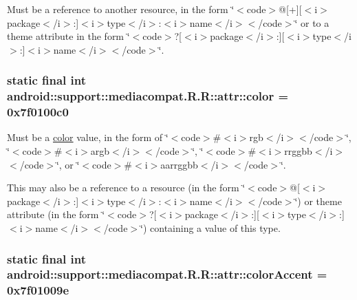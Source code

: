 Must be a reference to another resource, in the form \char`\"{}$<$code$>$@\mbox{[}+\mbox{]}\mbox{[}$<$i$>$package$<$/i$>$:\mbox{]}$<$i$>$type$<$/i$>$:$<$i$>$name$<$/i$>$$<$/code$>$\char`\"{} or to a theme attribute in the form \char`\"{}$<$code$>$?\mbox{[}$<$i$>$package$<$/i$>$:\mbox{]}\mbox{[}$<$i$>$type$<$/i$>$:\mbox{]}$<$i$>$name$<$/i$>$$<$/code$>$\char`\"{}. \hypertarget{classandroid_1_1support_1_1mediacompat_1_1_r_1_1attr_edf42dce0d16b57e1bfc7b63739b36f6}{
\subsubsection[{color}]{\setlength{\rightskip}{0pt plus 5cm}static final int android::support::mediacompat.R.R::attr::color = 0x7f0100c0}}
\label{classandroid_1_1support_1_1mediacompat_1_1_r_1_1attr_edf42dce0d16b57e1bfc7b63739b36f6}


Must be a \hyperlink{classandroid_1_1support_1_1mediacompat_1_1_r_1_1color}{color} value, in the form of \char`\"{}$<$code$>$\#$<$i$>$rgb$<$/i$>$$<$/code$>$\char`\"{}, \char`\"{}$<$code$>$\#$<$i$>$argb$<$/i$>$$<$/code$>$\char`\"{}, \char`\"{}$<$code$>$\#$<$i$>$rrggbb$<$/i$>$$<$/code$>$\char`\"{}, or \char`\"{}$<$code$>$\#$<$i$>$aarrggbb$<$/i$>$$<$/code$>$\char`\"{}. 

This may also be a reference to a resource (in the form \char`\"{}$<$code$>$@\mbox{[}$<$i$>$package$<$/i$>$:\mbox{]}$<$i$>$type$<$/i$>$:$<$i$>$name$<$/i$>$$<$/code$>$\char`\"{}) or theme attribute (in the form \char`\"{}$<$code$>$?\mbox{[}$<$i$>$package$<$/i$>$:\mbox{]}\mbox{[}$<$i$>$type$<$/i$>$:\mbox{]}$<$i$>$name$<$/i$>$$<$/code$>$\char`\"{}) containing a value of this type. \hypertarget{classandroid_1_1support_1_1mediacompat_1_1_r_1_1attr_957a32157f9c4159576781c43420c140}{
\subsubsection[{colorAccent}]{\setlength{\rightskip}{0pt plus 5cm}static final int android::support::mediacompat.R.R::attr::colorAccent = 0x7f01009e}}
\label{classandroid_1_1support_1_1mediacompat_1_1_r_1_1attr_957a32157f9c4159576781c43420c140}


